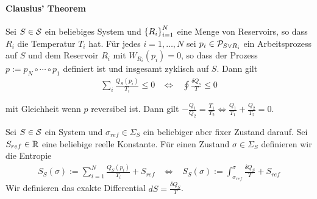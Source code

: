 \vspace{-10pt}

\paragraph{Clausius' Theorem}
Sei $S \in \S$ ein beliebiges System und $\geschwungeneklammer{R_i}_{i=1}^N$
eine Menge von Reservoirs, so dass $R_i$ die Temperatur $T_i$ hat. Für jedes
$i=1,\dots,N$ sei $p_i \in \P_{S \vee R_i}$ ein Arbeitsprozess auf $S$ und
dem Reservoir $R_i$ mit $W_{R_i}(p_i) = 0$, so dass der Prozess $p := p_N
\circ \dotsb \circ p_1$ definiert ist und insgesamt zyklisch auf $S$. Dann gilt
\begin{align*}
    \sum_i \frac{Q_S (p_i)}{T_i} \leq 0
    \hspace{10pt} \Leftrightarrow \hspace{10pt}
    \oint \frac{\delta Q_s}{T} \leq 0
\end{align*}

\vspace{-5pt}

mit Gleichheit wenn $p$ reversibel ist. Dann gilt
$- \frac{Q_1}{Q_2} = \frac{T_1}{T_2}
\Leftrightarrow \frac{Q_1}{T_1} + \frac{Q_2}{T_2} = 0$.

\begin{definition}[Entropie]
    Sei $S \in \S$ ein System und $\sigma_{ref} \in \Sigma_S$ ein beliebiger
    aber fixer Zustand darauf. Sei $S_{ref} \in \R$ eine beliebige reelle
    Konstante. Für einen Zustand $\sigma \in \Sigma_S$ definieren wir die
    Entropie
    \begin{align*}
        S_S (\sigma) := \sum_{i=1}^N \frac{Q_S (p_i)}{T_i} + S_{ref}
        \hspace{10pt} \Leftrightarrow \hspace{10pt}
        S_S (\sigma) := \int_{\sigma_{ref}}^\sigma \frac{\delta Q_S}{T} + S_{ref}
    \end{align*}
    Wir definieren das exakte Differential $dS = \frac{\delta Q_S}{T}$.
\end{definition}

